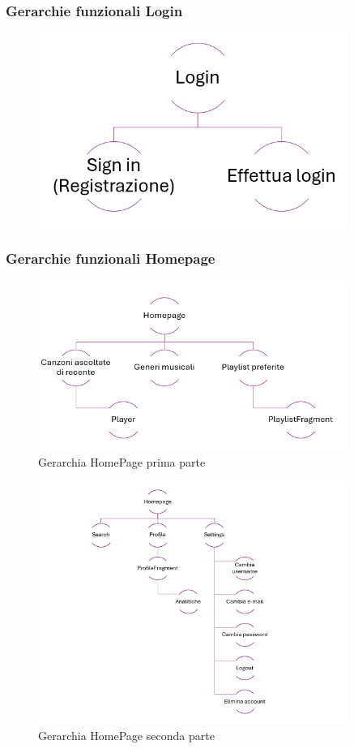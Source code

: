 \documentclass{article}
\begin{document}
		\subsubsection{Gerarchie funzionali Login}
		\begin{figure}[H]
			\centering
			\includegraphics[width=0.9\textwidth]{Immagini/gerarchialogin}
		\end{figure}
		\subsubsection{Gerarchie funzionali Homepage}
		\begin{figure}[H]
			\centering
			\includegraphics[width=0.9\textwidth]{Immagini/gerarchiahome1}
			\caption{Gerarchia HomePage prima parte}
		\end{figure}
		\begin{figure}[H]
			\centering
			\includegraphics[width=0.9\textwidth]{Immagini/gerarchiahome2}
			\caption{Gerarchia HomePage seconda parte}
		\end{figure}
		\newpage
\end{document}
